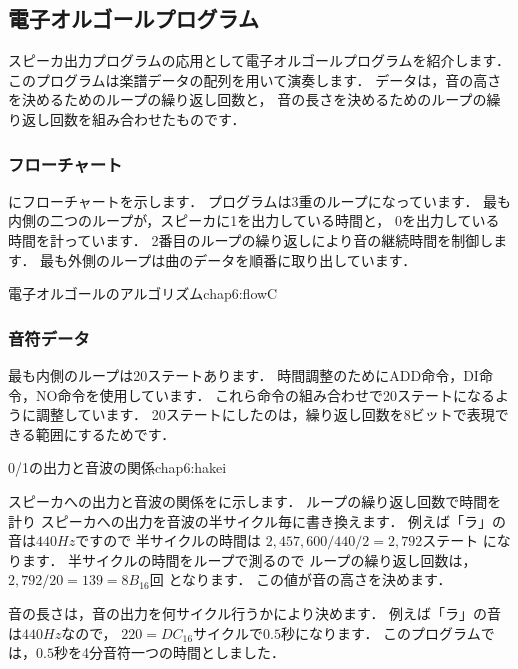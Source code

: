\newpage
\subsection{電子オルゴールプログラム}
スピーカ出力プログラムの応用として電子オルゴールプログラムを紹介します．
このプログラムは楽譜データの配列を用いて演奏します．
データは，音の高さを決めるためのループの繰り返し回数と，
音の長さを決めるためのループの繰り返し回数を組み合わせたものです．

\subsubsection{フローチャート}
にフローチャートを示します．
プログラムは3重のループになっています．
最も内側の二つのループが，スピーカに1を出力している時間と，
0を出力している時間を計っています．
2番目のループの繰り返しにより音の継続時間を制御します．
最も外側のループは曲のデータを順番に取り出しています．

{電子オルゴールのアルゴリズム}{chap6:flowC}

\subsubsection{音符データ}
最も内側のループは20ステートあります．
時間調整のためにADD命令，DI命令，NO命令を使用しています．
これら命令の組み合わせで20ステートになるように調整しています．
20ステートにしたのは，繰り返し回数を8ビットで表現できる範囲にするためです．

{0/1の出力と音波の関係}{chap6:hakei}

スピーカへの出力と音波の関係をに示します．
ループの繰り返し回数で時間を計り
スピーカへの出力を音波の半サイクル毎に書き換えます．
例えば「ラ」の音は$440Hz$ですので
半サイクルの時間は $2,457,600 / 440 / 2 = 2,792ステート$ になります．
半サイクルの時間をループで測るので
ループの繰り返し回数は，$2,792 / 20 = 139 = 8B_{16}回$ となります．
この値が音の高さを決めます．

音の長さは，音の出力を何サイクル行うかにより決めます．
例えば「ラ」の音は$440Hz$なので，
$220=DC_{16}サイクル$で$0.5秒$になります．
このプログラムでは，$0.5秒$を4分音符一つの時間としました．

